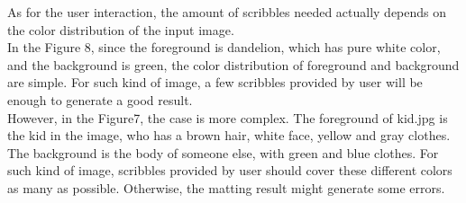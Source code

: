 \documentclass[11pt,letterpaper]{article}
\begin{document}
As for the user interaction, the amount of scribbles needed actually depends on the color distribution of the input image. \\

In the Figure 8, since the foreground is dandelion, which has pure white color, and the background is green, the color distribution of foreground and background are simple. For such kind of image, a few scribbles provided by user will be enough to generate a good result. \\

However, in the Figure7, the case is more complex. The foreground of kid.jpg is the kid in the image, who has a brown hair, white face, yellow and gray clothes. The background is the body of someone else, with green and blue clothes. For such kind of image, scribbles provided by user should cover these different colors as many as possible. Otherwise, the matting result might generate some errors.\\

\newpage
\end{document}
